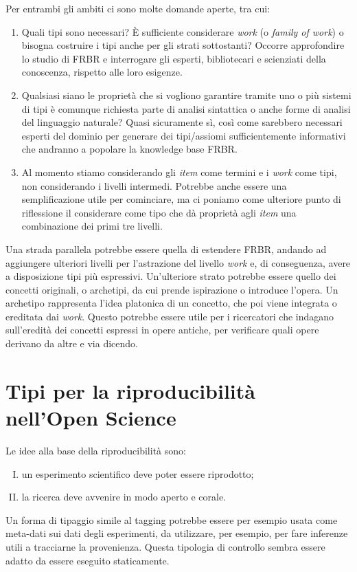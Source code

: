 Per entrambi gli ambiti ci sono molte domande aperte, tra cui:
\begin{enumerate}
	\item Quali tipi sono necessari? È sufficiente considerare \emph{work} (o \emph{family of work}) o bisogna costruire i tipi anche per gli strati sottostanti? Occorre 
	approfondire lo studio di FRBR e interrogare gli esperti, bibliotecari e scienziati della conoscenza, rispetto alle loro esigenze.
	\item Qualsiasi siano le proprietà che si vogliono garantire tramite uno o più sistemi di tipi è comunque richiesta parte di analisi sintattica o anche 
	forme di analisi del linguaggio naturale? Quasi sicuramente sì, così come sarebbero necessari esperti del dominio per generare dei tipi/assiomi 
	sufficientemente informativi che andranno a popolare la knowledge base FRBR.
	\item Al momento stiamo considerando gli \emph{item} come termini e i \emph{work} come tipi, non considerando i livelli intermedi. Potrebbe anche essere una 
	semplificazione utile per cominciare, ma ci poniamo come ulteriore punto di riflessione il considerare come tipo che dà proprietà agli \emph{item} una 
	combinazione dei primi tre livelli.
\end{enumerate}
\newpage\noindent
Una strada parallela potrebbe essere quella di estendere FRBR, andando ad aggiungere ulteriori livelli per l'astrazione del livello \emph{work} e, di conseguenza, 
avere a disposizione tipi più espressivi. Un'ulteriore strato potrebbe essere quello dei concetti originali, o archetipi, da cui prende ispirazione o introduce l'opera. Un archetipo rappresenta l'idea platonica di un concetto, che poi viene integrata o ereditata dai \emph{work}. Questo potrebbe essere utile 
per i ricercatori che indagano sull'eredità dei concetti espressi in opere antiche, per verificare quali opere derivano da altre e via dicendo.

\section{Tipi per la riproducibilità nell'Open Science}
Le idee alla base della riproducibilità sono: 
\begin{enumerate}[I)]
	\item un esperimento scientifico deve poter essere riprodotto; 
	\item la ricerca deve avvenire in modo aperto e corale. 
\end{enumerate}
Un forma di tipaggio simile al tagging potrebbe essere per esempio usata come meta-dati sui dati degli esperimenti, da utilizzare, per esempio, per 
fare inferenze utili a tracciarne la provenienza. Questa tipologia di controllo sembra essere adatto da essere eseguito staticamente.